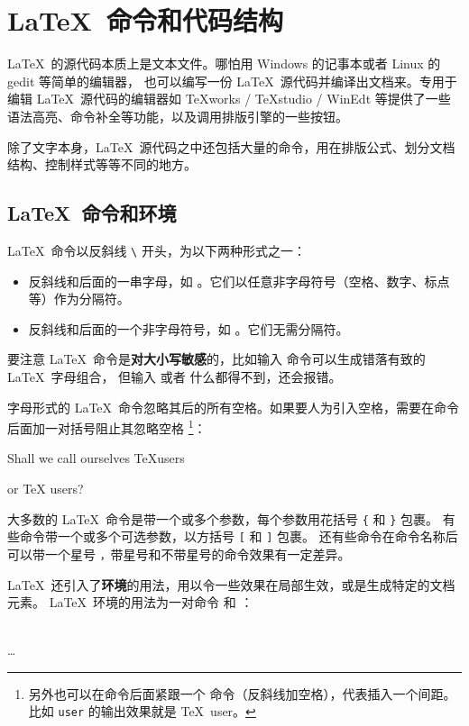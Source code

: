 \section{\LaTeX\ 命令和代码结构}\label{sec:src}

\LaTeX\ 的源代码本质上是文本文件。哪怕用 Windows 的记事本或者 Linux 的 gedit 等简单的编辑器，
也可以编写一份 \LaTeX\ 源代码并编译出文档来。专用于编辑 \LaTeX\ 源代码的编辑器如
TeXworks / TeXstudio / WinEdt 等提供了一些语法高亮、命令补全等功能，以及调用排版引擎的一些按钮。

除了文字本身，\LaTeX\ 源代码之中还包括大量的命令，用在排版公式、划分文档结构、控制样式等等不同的地方。

\subsection{\LaTeX\ 命令和环境}\label{subsec:cmds}

\LaTeX\ 命令以反斜线 \texttt{\textbackslash} 开头，为以下两种形式之一：
\begin{itemize}
  \item 反斜线和后面的一串字母，如 。它们以任意非字母符号（空格、数字、标点等）作为分隔符。
  \item 反斜线和后面的一个非字母符号，如 \cmd{\$}。它们无需分隔符。
\end{itemize}

要注意 \LaTeX\ 命令是\textbf{对大小写敏感}的，比如输入  命令可以生成错落有致的 \LaTeX\ 字母组合，
但输入  或者  什么都得不到，还会报错。

字母形式的 \LaTeX\ 命令忽略其后的所有空格。如果要人为引入空格，需要在命令后面加一对括号阻止其忽略空格%
\footnote{另外也可以在命令后面紧跟一个 \cmd{\textvisiblespace} 命令（反斜线加空格），代表插入一个间距。
比如 \cmd{\textvisiblespace}\texttt{user} 的输出效果就是 \TeX\ user。}：
\begin{example}
Shall we call ourselves 
\TeX users 

or \TeX{} users?
\end{example}

大多数的 \LaTeX\ 命令是带一个或多个参数，每个参数用花括号 \texttt\{ 和 \texttt\} 包裹。
有些命令带一个或多个可选参数，以方括号 \texttt[ 和 \texttt] 包裹。
还有些命令在命令名称后可以带一个星号 \texttt*，带星号和不带星号的命令效果有一定差异。

\LaTeX\ 还引入了\textbf{环境}的用法，用以令一些效果在局部生效，或是生成特定的文档元素。
\LaTeX\ 环境的用法为一对命令  和 ：
\begin{command}
 \\
\ldots \\
\end{command}

